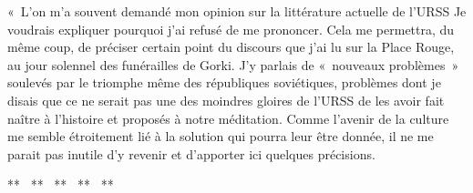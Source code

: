 \documentclass[french,twoside]{book} %
\begin{document}
« L’on m’a souvent demandé mon opinion sur la littérature actuelle de l’URSS Je voudrais expliquer pourquoi j’ai refusé de me prononcer. Cela me permettra, du même coup, de préciser certain point du discours que j’ai lu sur la Place Rouge, au jour solennel des funérailles de Gorki. J’y parlais de « nouveaux problèmes » soulevés par le triomphe même des républiques soviétiques, problèmes dont je disais que ce ne serait pas une des moindres gloires de l’URSS de les avoir fait naître à l’histoire et proposés à notre méditation. Comme l’avenir de la culture me semble étroitement lié à la solution qui pourra leur être donnée, il ne me parait pas inutile d’y revenir et d’apporter ici quelques précisions.\par

\begin{center}
\noindent \centerline{**  **  **  **  **}\par
\end{center}
\end{document}
